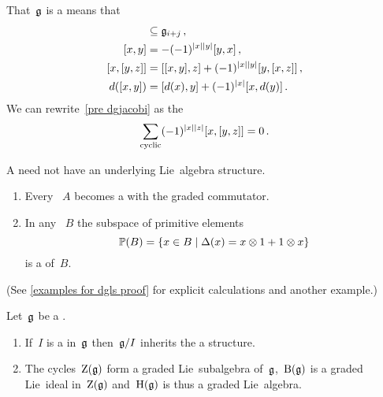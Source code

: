 \documentclass[a4paper,10pt,headings=standardclasses]{scrartcl}
\begin{document}
\begin{remark}
  That~$\mathfrak{g}$ is a {\dgl} means that
  \begin{align}
    [\glie_i, \glie_j]
    &\subseteq
    \glie_{i+j} \,,
    \notag
  \\
    [x,y]
    &=
    -(-1)^{\hdeg{x} \hdeg{y}} [y,x] \,,
    \notag
  \\
    [x, [y,z]]
    &=
    [[x,y], z]
    +
    (-1)^{\hdeg{x} \hdeg{y}}
    [y, [x,z]] \,,
    \label{pre dgjacobi}
  \\
    d([x,y])
    &=
    [d(x), y] + (-1)^{\hdeg{x}} [x, d(y)] \,.
    \notag
  \end{align}
  We can rewrite~\eqref{pre dgjacobi} as the 
  \[
    \sum_{\text{cyclic}}
    (-1)^{\lvert x\rvert \lvert z\rvert} [x, [y,z]]
    =
    0 \,.
  \]
\end{remark}

\begin{warning}
  A {\dgl} need not have an underlying Lie~algebra structure.
\end{warning}

\begin{example}
  \label{examples for dgls}
  \leavevmode
  \begin{enumerate}
    \item
      Every {\dga}~$A$ becomes a {\dgl} with the graded commutator.
    \item
      In any {\dgb}~$B$ the subspace of primitive elements
      \[
        \prim(B)
        =
        \{
          x \in B
        \suchthat
          \Delta(x) = x \tensor 1 + 1 \tensor x
        \}
      \]
      is a {\dglsub} of~$B$.
  \end{enumerate}
  (See \cref{examples for dgls proof} for explicit calculations and another example.)
\end{example}

\begin{lemma}
  \label{induced dgl}
  Let~$\mathfrak{g}$ be a {\dgl}.
  \begin{enumerate}
    \item
      If~$I$ is a {\dgli} in~$\mathfrak{g}$ then~$\mathfrak{g}/I$ inherits the a {\dgl} structure.
    \item
      The cycles~$\operatorname{Z}(\mathfrak{g})$ form a graded Lie~subalgebra of~$\mathfrak{g}$,~$\operatorname{B}(\mathfrak{g})$ is a graded Lie~ideal in~$\operatorname{Z}(\mathfrak{g})$ and~$\operatorname{H}(\mathfrak{g})$ is thus a graded Lie~algebra. 
  \end{enumerate}
\end{lemma}
\end{document}
